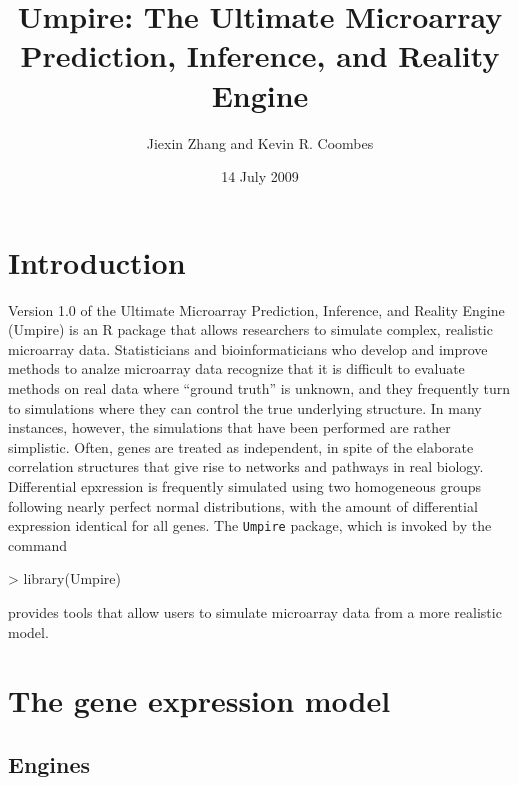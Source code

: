 \documentclass[11pt]{article}
\title{Umpire: The Ultimate Microarray Prediction, Inference, and
  Reality Engine}
\author{Jiexin Zhang and Kevin R. Coombes}
\date{14 July 2009}
\def\rpkg#1{\texttt{#1}}
\begin{document}
\maketitle

\section{Introduction}

Version 1.0 of the Ultimate Microarray Prediction, Inference, and
Reality Engine (Umpire) is an R package that allows researchers to
simulate complex, realistic microarray data.  Statisticians and
bioinformaticians who develop and improve methods to analze microarray
data recognize that it is difficult to evaluate methods on real data
where ``ground truth'' is unknown, and they frequently turn to
simulations where they can control the true underlying structure.  In
many instances, however, the simulations that have been performed are
rather simplistic.  Often, genes are treated as independent, in spite
of the elaborate correlation structures that give rise to networks and
pathways in real biology.  Differential epxression is frequently
simulated using two homogeneous groups following nearly perfect normal
distributions, with the amount of differential expression identical
for all genes.  The \rpkg{Umpire} package, which is invoked by the command
\begin{Schunk}
\begin{Sinput}
> library(Umpire)
\end{Sinput}
\end{Schunk}
provides tools that allow users to simulate microarray data from a
more realistic model.

\section{The gene expression model}
\subsection{Engines}
\end{document}

